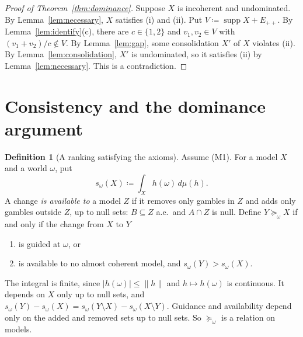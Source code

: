 \documentclass[11pt]{article}
\theoremstyle{definition}
\newtheorem{definition}[theorem]{Definition}
\newcommand{\Epp}{E_{++}}
\DeclareMathOperator{\supp}{supp}
\begin{document}
\begin{proof}[Proof of Theorem~\ref{thm:dominance}]
Suppose $X$ is incoherent and undominated. By Lemma~\ref{lem:necessary}, $X$ satisfies (i) and (ii). Put $V\coloneqq\supp X+\Epp$. By Lemma~\ref{lem:identify}(c), there are $c\in\{1,2\}$ and $v_1,v_2\in V$ with $(v_1+v_2)/c\notin V$. By Lemma~\ref{lem:gap}, some consolidation $X'$ of $X$ violates (ii). By Lemma~\ref{lem:consolidation}, $X'$ is undominated, so it satisfies (ii) by Lemma~\ref{lem:necessary}. This is a contradiction.
\end{proof}

\section{Consistency and the dominance argument}\label{sec:consistency}

\begin{definition}[A ranking satisfying the axioms]\label{def:integral}
Assume (M1). For a model $X$ and a world $\omega$, put
\[
s_\omega(X)\coloneqq\int_Xh(\omega)\,d\mu(h).
\]
A change \emph{is available to} a model $Z$ if it removes only gambles in $Z$ and adds only gambles outside $Z$, up to null sets: $B\subseteq Z$ a.e.\ and $A\cap Z$ is null. Define $Y\succeq_\omega X$ if and only if the change from $X$ to $Y$
\begin{enumerate}[label=(\roman*)]
\item is guided at $\omega$, or
\item is available to no almost coherent model, and $s_\omega(Y)>s_\omega(X)$.
\end{enumerate}
\end{definition}

The integral is finite, since $|h(\omega)|\le\|h\|$ and $h\mapsto h(\omega)$ is continuous. It depends on $X$ only up to null sets, and $s_\omega(Y)-s_\omega(X)=s_\omega(Y\setminus X)-s_\omega(X\setminus Y)$. Guidance and availability depend only on the added and removed sets up to null sets. So $\succeq_\omega$ is a relation on models.
\end{document}
